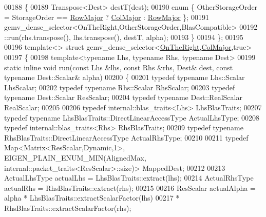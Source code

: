 \begin{DoxyCode}
00188   \{
00189     Transpose<Dest> destT(dest);
00190     \textcolor{keyword}{enum} \{ OtherStorageOrder = StorageOrder == \hyperlink{group__enums_ggaacded1a18ae58b0f554751f6cdf9eb13acfcde9cd8677c5f7caf6bd603666aae3}{RowMajor} ? \hyperlink{group__enums_ggaacded1a18ae58b0f554751f6cdf9eb13a0cbd4bdd0abcfc0224c5fcb5e4f6669a}{ColMajor} : 
      \hyperlink{group__enums_ggaacded1a18ae58b0f554751f6cdf9eb13acfcde9cd8677c5f7caf6bd603666aae3}{RowMajor} \};
00191     gemv\_dense\_selector<OnTheRight,OtherStorageOrder,BlasCompatible>
00192       ::run(rhs.transpose(), lhs.transpose(), destT, alpha);
00193   \}
00194 \};
00195 
00196 \textcolor{keyword}{template}<> \textcolor{keyword}{struct }gemv\_dense\_selector<\hyperlink{group__enums_ggac22de43beeac7a78b384f99bed5cee0ba99dc75d8e00b6c3a5bdc31940f47492b}{OnTheRight},\hyperlink{group__enums_ggaacded1a18ae58b0f554751f6cdf9eb13a0cbd4bdd0abcfc0224c5fcb5e4f6669a}{ColMajor},true>
00197 \{
00198   \textcolor{keyword}{template}<\textcolor{keyword}{typename} Lhs, \textcolor{keyword}{typename} Rhs, \textcolor{keyword}{typename} Dest>
00199   \textcolor{keyword}{static} \textcolor{keyword}{inline} \textcolor{keywordtype}{void} run(\textcolor{keyword}{const} Lhs &lhs, \textcolor{keyword}{const} Rhs &rhs, Dest& dest, \textcolor{keyword}{const} \textcolor{keyword}{typename} Dest::Scalar& alpha)
00200   \{
00201     \textcolor{keyword}{typedef} \textcolor{keyword}{typename} Lhs::Scalar   LhsScalar;
00202     \textcolor{keyword}{typedef} \textcolor{keyword}{typename} Rhs::Scalar   RhsScalar;
00203     \textcolor{keyword}{typedef} \textcolor{keyword}{typename} Dest::Scalar  ResScalar;
00204     \textcolor{keyword}{typedef} \textcolor{keyword}{typename} Dest::RealScalar  RealScalar;
00205     
00206     \textcolor{keyword}{typedef} internal::blas\_traits<Lhs> LhsBlasTraits;
00207     \textcolor{keyword}{typedef} \textcolor{keyword}{typename} LhsBlasTraits::DirectLinearAccessType ActualLhsType;
00208     \textcolor{keyword}{typedef} internal::blas\_traits<Rhs> RhsBlasTraits;
00209     \textcolor{keyword}{typedef} \textcolor{keyword}{typename} RhsBlasTraits::DirectLinearAccessType ActualRhsType;
00210   
00211     \textcolor{keyword}{typedef} Map<Matrix<ResScalar,Dynamic,1>, EIGEN\_PLAIN\_ENUM\_MIN(AlignedMax,
      internal::packet\_traits<ResScalar>::size)> MappedDest;
00212 
00213     ActualLhsType actualLhs = LhsBlasTraits::extract(lhs);
00214     ActualRhsType actualRhs = RhsBlasTraits::extract(rhs);
00215 
00216     ResScalar actualAlpha = alpha * LhsBlasTraits::extractScalarFactor(lhs)
00217                                   * RhsBlasTraits::extractScalarFactor(rhs);

\end{DoxyCode}
